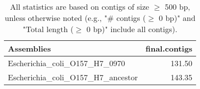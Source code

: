 \documentclass[12pt,a4paper]{article}
\begin{document}
\begin{table}[ht]
\begin{center}
\caption{All statistics are based on contigs of size $\geq$ 500 bp, unless otherwise noted (e.g., "\# contigs ($\geq$ 0 bp)" and "Total length ($\geq$ 0 bp)" include all contigs).}
\begin{tabular}{|l*{1}{|r}|}
\hline
Assemblies & final.contigs \\ \hline
Escherichia\_coli\_O157\_H7\_0970 & 131.50 \\ \hline
Escherichia\_coli\_O157\_H7\_ancestor & 143.35 \\ \hline
\end{tabular}
\end{center}
\end{table}
\end{document}
